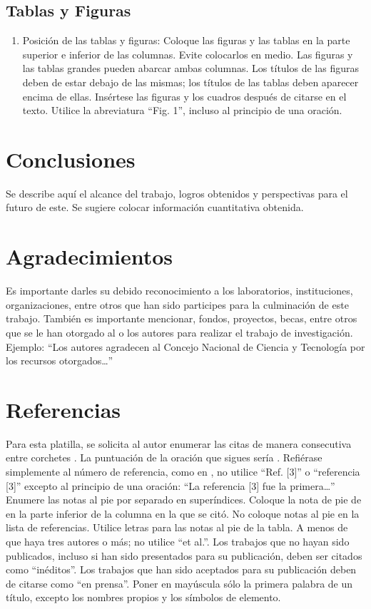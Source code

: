     \subsection{Tablas y Figuras}
    
    \begin{enumerate}
        \item Posición de las tablas y figuras: Coloque las figuras y las tablas en la parte superior e inferior de las columnas. Evite colocarlos en medio. Las figuras y las tablas grandes pueden abarcar ambas columnas. Los títulos de las figuras deben de estar debajo de las mismas; los títulos de las tablas deben aparecer encima de ellas. Insértese las figuras y los cuadros después de citarse en el texto. Utilice la abreviatura “Fig. 1”, incluso al principio de una oración. 
    \end{enumerate}
    
    \section{Conclusiones}
    
    Se describe aquí el alcance del trabajo, logros obtenidos y perspectivas para el futuro de este. Se sugiere colocar información cuantitativa obtenida.
    
    \section{Agradecimientos}
    
    Es importante darles su debido reconocimiento a los laboratorios, instituciones, organizaciones, entre otros que han sido participes para la culminación de este trabajo. También es importante mencionar, fondos, proyectos, becas, entre otros que se le han otorgado al o los autores para realizar el trabajo de investigación. Ejemplo: “Los autores agradecen al Concejo Nacional de Ciencia y Tecnología por los recursos otorgados…”
    
    \section*{Referencias}
    
    Para esta platilla, se solicita al autor enumerar las citas de manera consecutiva entre corchetes \cite{YLi2013}. 
    La puntuación de la oración que sigues sería \cite{Mesaelides2011}. 
    Refiérase simplemente al número de referencia, como en \cite{Morales2012}, no utilice “Ref. [3]” o “referencia [3]” excepto al principio de una oración: “La referencia [3] fue la primera…”
    Enumere las notas al pie por separado en superíndices. Coloque la nota de pie de en la parte inferior de la columna en la que se citó. No coloque notas al pie en la lista de referencias. Utilice letras para las notas al pie de la tabla.
    A menos de que haya tres autores o más; no utilice “et al.”. Los trabajos que no hayan sido publicados, incluso si han sido presentados para su publicación, deben ser citados como “inéditos”. Los trabajos que han sido aceptados para su publicación deben de citarse como “en prensa”. Poner en mayúscula sólo la primera palabra de un título, excepto los nombres propios y los símbolos de elemento. 
    
